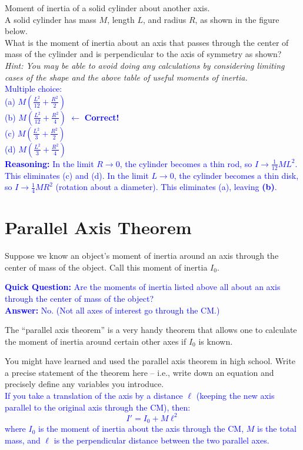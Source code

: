 \documentclass[11pt, letterpaper, openany]{book}
\newenvironment{exercise}[1][Exercise]{%
  \tcolorbox[blanker, breakable, left=1em,
    before skip=1em, after skip=1em,
    borderline west={3pt}{0pt}{PhysNavy},
    colback=PhysCream,
    before upper={\textcolor{PhysNavy}{\sffamily\bfseries #1:}\space}
  ]%
}{%
  \endtcolorbox%
}
\begin{document}
\begin{exercise}[Exercise 4]
Moment of inertia of a solid cylinder about another axis. \\
A solid cylinder has mass $M$, length $L$, and radius $R$, as shown in the figure below. \\
What is the moment of inertia about an axis that passes through the center of mass of the cylinder and is perpendicular to the axis of symmetry as shown? \\
\textit{Hint: You may be able to avoid doing any calculations by considering limiting cases of the shape and the above table of useful moments of inertia.} \\
\textcolor{blue}{
Multiple choice: \\
(a) $M\left(\frac{L^2}{12} + \frac{R^2}{2}\right)$ \\
(b) $M\left(\frac{L^2}{12} + \frac{R^2}{4}\right)$ $\leftarrow$ \textbf{Correct!} \\
(c) $M\left(\frac{L^2}{3} + \frac{R^2}{2}\right)$ \\
(d) $M\left(\frac{L^2}{3} + \frac{R^2}{4}\right)$ \\
\textbf{Reasoning:} In the limit $R \to 0$, the cylinder becomes a thin rod, so $I \to \frac{1}{12}ML^2$. This eliminates (c) and (d). In the limit $L \to 0$, the cylinder becomes a thin disk, so $I \to \frac{1}{4}MR^2$ (rotation about a diameter). This eliminates (a), leaving \textbf{(b)}.
}
\end{exercise}

\section*{Parallel Axis Theorem}

Suppose we know an object's moment of inertia around an axis through the center of mass of the object. Call this moment of inertia $I_0$.

\textcolor{blue}{\textbf{Quick Question:} Are the moments of inertia listed above all about an axis through the center of mass of the object? \\
\textbf{Answer:} No. (Not all axes of interest go through the CM.)}

The ``parallel axis theorem'' is a very handy theorem that allows one to calculate the moment of inertia around certain other axes if $I_0$ is known.

\begin{exercise}[Exercise 5]
You might have learned and used the parallel axis theorem in high school. Write a precise statement of the theorem here -- i.e., write down an equation and precisely define any variables you introduce. \\
\textcolor{blue}{
If you take a translation of the axis by a distance $\ell$ (keeping the new axis parallel to the original axis through the CM), then:
\[ I' = I_0 + M\ell^2 \]
where $I_0$ is the moment of inertia about the axis through the CM, $M$ is the total mass, and $\ell$ is the perpendicular distance between the two parallel axes.
}
\end{exercise}
\end{document}
